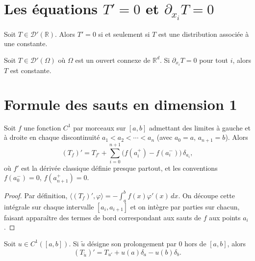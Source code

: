 \documentclass[12pt,a4paper,openany]{book}
\theoremstyle{definition}
\theoremstyle{plain}
\theoremstyle{remark}
\begin{document}
	\section{Les équations \texorpdfstring{$T'=0$}{T'=0} et \texorpdfstring{$\partial_{x_i} T = 0$}{dxi T = 0}}
	
	\begin{proposition}
		Soit $T \in \mathcal{D}'(\mathbb{R})$. Alors $T' = 0$ si et seulement si $T$ est une distribution associée à une constante.
	\end{proposition}
	
	\begin{corollary}
		Soit $T \in \mathcal{D}'(\Omega)$ où $\Omega$ est un ouvert connexe de $\mathbb{R}^d$. Si $\partial_{x_i} T = 0$ pour tout $i$, alors $T$ est constante.
	\end{corollary}
	
	\section{Formule des sauts en dimension 1}
	
	\begin{theorem}
		Soit $f$ une fonction $C^1$ par morceaux sur $[a,b]$ admettant des limites à gauche et à droite en chaque discontinuité $a_1 < a_2 < \cdots < a_n$ (avec $a_0 = a$, $a_{n+1} = b$). Alors
		\[
		(T_f)' = T_{f'} + \sum_{i=0}^{n+1} \bigl(f(a_i^+) - f(a_i^-)\bigr)\,\delta_{a_i},
		\]
		où $f' $ est la dérivée classique définie presque partout, et les conventions $f(a_0^-) = 0$, $f(a_{n+1}^+) = 0$.
	\end{theorem}
	
	\begin{proof}
		Par définition, $\langle (T_f)', \varphi \rangle = -\int_a^b f(x)\varphi'(x)\,dx$. On découpe cette intégrale sur chaque intervalle $[a_i, a_{i+1}]$ et on intègre par parties sur chacun, faisant apparaître des termes de bord correspondant aux sauts de $f$ aux points $a_i$.
	\end{proof}
	
	\begin{proposition}
		Soit $u \in C^1([a,b])$. Si $\tilde{u}$ désigne son prolongement par $0$ hors de $[a,b]$, alors
		\[
		(T_{\tilde{u}})' = T_{u'} + u(a)\delta_a - u(b)\delta_b.
		\]
	\end{proposition}
	
\end{document}
